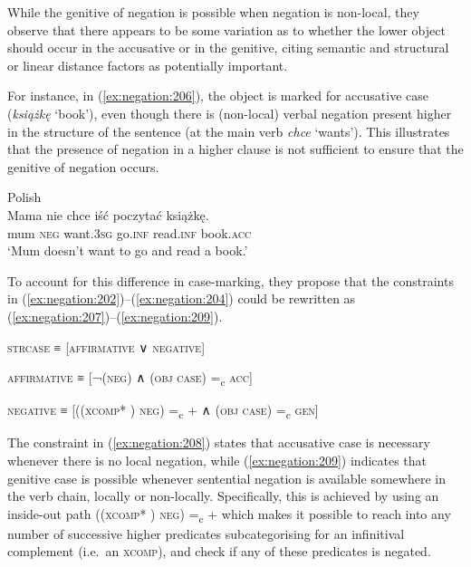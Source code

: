 \documentclass[output=paper,hidelinks]{langscibook}
\begin{document}
While the genitive of negation is possible when negation is non-local, they observe that there appears to be some variation as to whether the lower object should occur in the accusative or in the genitive, citing semantic and structural or linear distance factors as potentially important. 

For instance, in (\ref{ex:negation:206}), the object is marked for accusative case (\emph{książkę} ‘book’), even though there is (non-local) verbal negation present higher in the structure of the sentence (at the main verb \emph{chce} ‘wants’). This illustrates that the presence of negation in a higher clause is not sufficient to ensure that the genitive of negation occurs. 

\ea\label{ex:negation:206} Polish \citep [432] {PatejukPrzepiorkowski2014a} \\
\gll Mama nie chce iść poczytać książkę.\\
mum \textsc{neg} want.\textsc{3sg} go.\textsc{inf} read.\textsc{inf} book.\textsc{acc} \\
\glt ‘Mum doesn’t want to go and read a book.’
\z

To account for this difference in case-marking, they propose that the constraints in (\ref{ex:negation:202})--(\ref{ex:negation:204}) could be rewritten as (\ref{ex:negation:207})--(\ref{ex:negation:209}).

\ea
\label{ex:negation:207} 
\textsc{strcase} ≡ [\textsc{affirmative} ∨ \textsc{negative}]\\
\z
 
\ea
\label{ex:negation:208} 
\textsc{affirmative} ≡ [¬(\UP \textsc{neg}) ∧ (\UP \textsc{obj case}) =\textsubscript{c}  \textsc{acc}] 
 \z
 
\ea
\label{ex:negation:209} 
\textsc{negative} ≡ [((\textsc{xcomp*} \UP)  \textsc{neg}) =\textsubscript{c}  + ∧ (\UP \textsc {obj case}) =\textsubscript{c} \textsc{gen}] 
 \z

The constraint in (\ref{ex:negation:208}) states that accusative case is necessary whenever there is no local negation, while (\ref{ex:negation:209}) indicates that genitive case is possible whenever sentential negation is available somewhere in the verb chain, locally or non-locally. Specifically, this is achieved by using an inside-out path ((\textsc{xcomp*} \UP) \textsc{neg}) =\textsubscript{c} + which makes it possible to reach into any number of successive higher predicates subcategorising for an infinitival complement (i.e.\ an \textsc{xcomp}), and check if any of these predicates is negated.
\end{document}
